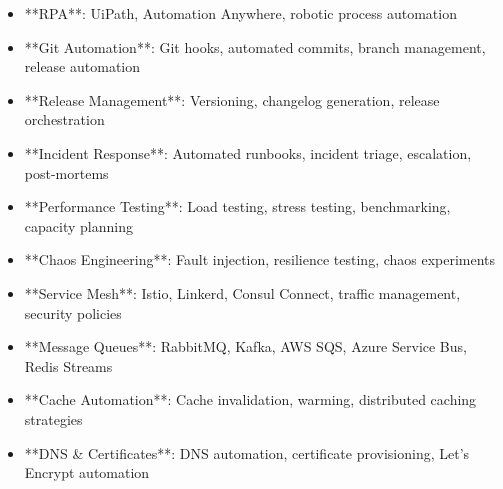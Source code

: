 \documentclass[11pt,a4paper]{article}
\begin{document}
\begin{itemize}
\item **RPA**: UiPath, Automation Anywhere, robotic process automation
\end{itemize}

\begin{itemize}
\item **Git Automation**: Git hooks, automated commits, branch management, release automation
\end{itemize}

\begin{itemize}
\item **Release Management**: Versioning, changelog generation, release orchestration
\end{itemize}

\begin{itemize}
\item **Incident Response**: Automated runbooks, incident triage, escalation, post-mortems
\end{itemize}

\begin{itemize}
\item **Performance Testing**: Load testing, stress testing, benchmarking, capacity planning
\end{itemize}

\begin{itemize}
\item **Chaos Engineering**: Fault injection, resilience testing, chaos experiments
\end{itemize}

\begin{itemize}
\item **Service Mesh**: Istio, Linkerd, Consul Connect, traffic management, security policies
\end{itemize}

\begin{itemize}
\item **Message Queues**: RabbitMQ, Kafka, AWS SQS, Azure Service Bus, Redis Streams
\end{itemize}

\begin{itemize}
\item **Cache Automation**: Cache invalidation, warming, distributed caching strategies
\end{itemize}

\begin{itemize}
\item **DNS & Certificates**: DNS automation, certificate provisioning, Let's Encrypt automation
\end{itemize}
\end{document}
